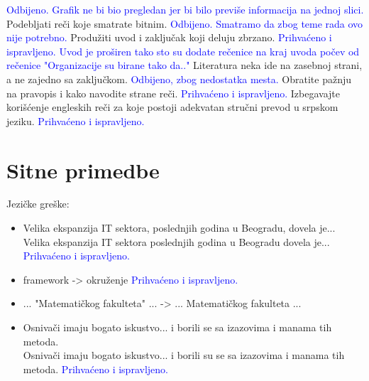 \documentclass[a4paper]{report}
\newcommand{\odgovor}[1]{\textcolor{blue}{#1}}
\begin{document}
\odgovor{Odbijeno. Grafik ne bi bio pregledan jer bi bilo previše informacija na jednoj slici.}
Podebljati reči koje smatrate bitnim. \odgovor{Odbijeno. Smatramo da zbog teme rada ovo nije potrebno.}
Produžiti uvod i zaključak koji deluju zbrzano.  \odgovor{Prihvaćeno i ispravljeno. Uvod je proširen tako sto su dodate rečenice na kraj uvoda počev od rečenice "Organizacije su birane tako da.."}
Literatura neka ide na zasebnoj strani, a ne zajedno sa zaključkom. \odgovor{Odbijeno, zbog nedostatka mesta.}
Obratite pažnju na pravopis i kako navodite strane reči. \odgovor{Prihvaćeno i ispravljeno.}
Izbegavajte korišćenje engleskih reči za koje postoji adekvatan stručni prevod u srpskom jeziku. \odgovor{Prihvaćeno i ispravljeno.}

\section{Sitne primedbe}
Jezičke greške: \begin{itemize}
\item Velika ekspanzija IT sektora, poslednjih godina u Beogradu, dovela je...\\
      Velika ekspanzija IT sektora poslednjih godina u Beogradu dovela je...
      \odgovor{Prihvaćeno i ispravljeno.}
\item framework -> okruženje \odgovor{Prihvaćeno i ispravljeno.}
\item ... "Matematičkog fakulteta" ... -> ... Matematičkog fakulteta ... 
\item Osnivači imaju bogato iskustvo... i borili se sa izazovima i manama tih metoda. \\
      Osnivači imaju bogato iskustvo... i borili su se sa izazovima i manama tih metoda.
       \odgovor{Prihvaćeno i ispravljeno.}
\end{itemize}
\end{document}
